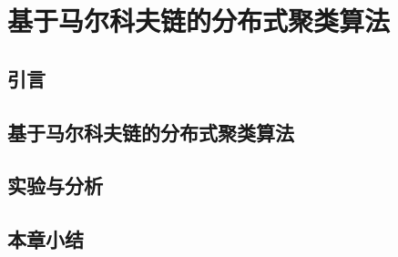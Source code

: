 \chapter{基于马尔科夫链的分布式聚类算法}

\section{引言}

\section{基于马尔科夫链的分布式聚类算法}


\section{实验与分析}

\section{本章小结}
